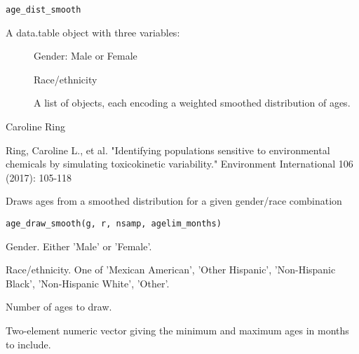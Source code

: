 \documentclass[a4paper]{book}
\begin{document}
%
\begin{Usage}
\begin{verbatim}
age_dist_smooth
\end{verbatim}
\end{Usage}
%
\begin{Format}
A data.table object with three variables: \begin{description}

\item[] Gender: Male or Female
\item[] Race/ethnicity\item[] A list of
 objects, each encoding a weighted smoothed distribution of
ages.
\end{description}

\end{Format}
%
\begin{Author}\relax
Caroline Ring
\end{Author}
%
\begin{References}\relax
Ring, Caroline L., et al. "Identifying populations sensitive to
environmental chemicals by simulating toxicokinetic variability." Environment
International 106 (2017): 105-118
\end{References}
%
\begin{Description}\relax
Draws ages from a smoothed distribution for a given gender/race combination
\end{Description}
%
\begin{Usage}
\begin{verbatim}
age_draw_smooth(g, r, nsamp, agelim_months)
\end{verbatim}
\end{Usage}
%
\begin{Arguments}
\begin{ldescription}
\item[\code{g}] Gender. Either 'Male' or 'Female'.

\item[\code{r}] Race/ethnicity. One of 'Mexican American', 'Other Hispanic',
'Non-Hispanic Black', 'Non-Hispanic White', 'Other'.

\item[\code{nsamp}] Number of ages to draw.

\item[\code{agelim\_months}] Two-element numeric vector giving the minimum and
maximum ages in months to include.
\end{ldescription}
\end{Arguments}
\end{document}
